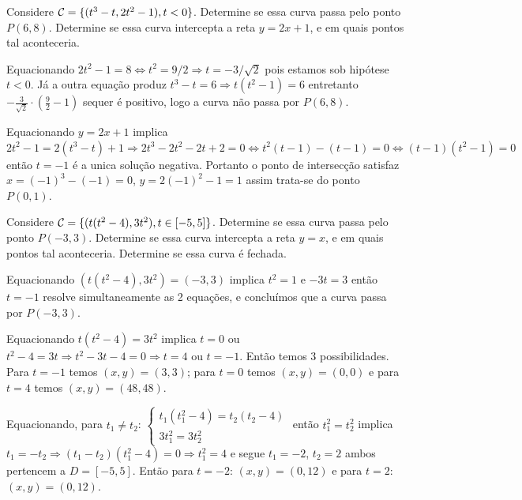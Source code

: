 \begin{exeresol}
Considere ${\cal C} = \{ (t^3-t,2t^2-1), t < 0 \}$. Determine se essa curva passa pelo ponto $P(6,8)$. Determine se essa curva intercepta a reta $y=2x+1$, e em quais pontos tal aconteceria.
\end{exeresol}
\begin{resol}
Equacionando $2t^2-1 = 8 \Leftrightarrow t^2=9/2 \Rightarrow t=-3/\sqrt{2}$ pois estamos sob hipótese $t< 0$. Já a outra equação produz $t^3-t = 6 \Rightarrow t(t^2-1) = 6$ entretanto $-\frac{3}{\sqrt{2}} \cdot \left(\frac{9}{2}-1\right) $ sequer é positivo, logo a curva não passa por $P(6,8)$. 

Equacionando $y=2x+1$ implica $2t^2-1 = 2(t^3-t) + 1 \Rightarrow 2t^3-2t^2-2t+2 = 0 \Leftrightarrow t^2(t-1) -(t-1) = 0 \Leftrightarrow (t-1)(t^2-1)=0$ então $t=-1$ é a unica solução negativa. Portanto o ponto de intersecção 
satisfaz $x=(-1)^3-(-1)=0$, $y=2(-1)^2-1 = 1$ assim trata-se do ponto $P(0,1)$.
\end{resol}


\begin{exeresol}
Considere ${\cal C} = \{ (t(t^2-4),3t^2), t \in [-5,5] \}$. Determine se essa curva passa pelo ponto $P(-3,3)$. Determine se essa curva intercepta a reta $y=x$, e em quais pontos tal aconteceria.
Determine se essa curva é fechada.
\end{exeresol}
\begin{resol}
Equacionando $(t(t^2-4),3t^2)=(-3,3)$ implica $t^2=1$ e $-3t=3$ então $t=-1$ resolve simultaneamente as 2 equações, e concluímos que a curva passa por $P(-3,3)$.

Equacionando $t(t^2-4) = 3t^2$ implica $t=0$ ou $t^2-4 = 3t \Rightarrow t^2-3t-4=0 \Rightarrow t=4 $ ou $t=-1$. Então temos 3 possibilidades. Para $t=-1$ temos $(x,y)=(3,3)$; para $t=0$ temos $(x,y)=(0,0)$ e para $t=4$ temos $(x,y)=(48,48)$.

Equacionando, para $t_1 \neq t_2$:  $\left\{ \begin{array}{l} 
t_1(t_1^2-4)=t_2(t_2-4) \\
3t_1^2 = 3t_2^2 \end{array} \right. $ então $t_1^2=t_2^2$ implica $t_1 = -t_2 \Rightarrow (t_1-t_2)(t_1^2-4) = 0 \Rightarrow t_1^2 = 4$ e segue $t_1=-2$, $t_2=2$ ambos pertencem a $D=[-5,5]$. Então para $t=-2$: $(x,y)=(0,12)$ e para $t=2$: $(x,y)=(0,12)$.  
\end{resol}

